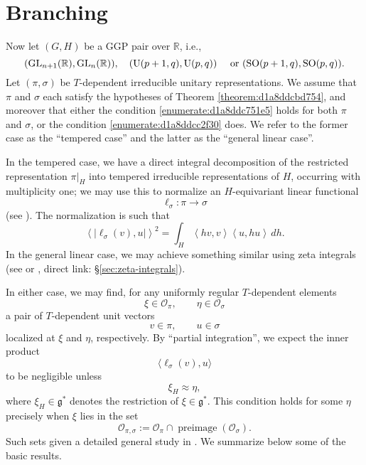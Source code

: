 \documentclass[reqno]{amsart} 
\numberwithin{equation}{section}
\numberwithin{theorem}{section}
\begin{document}
\section{Branching}\label{sec:d1a8de615a31}
Now let $(G,H)$ be a GGP pair over $\mathbb{R}$, i.e.,
\begin{equation*}
  (\operatorname{GL}_{n+1}(\mathbb{R}), \operatorname{GL}_n(\mathbb{R})),
  \quad
  (\operatorname{U}(p+1,q), \operatorname{U}(p,q))
  \quad
  \text{ or } 
  (\operatorname{SO}(p+1,q), \operatorname{SO}(p,q)).
\end{equation*}
Let $(\pi,\sigma)$ be $T$-dependent irreducible unitary representations.  We assume that $\pi$ and $\sigma$ each satisfy the hypotheses of Theorem \ref{theorem:d1a8ddcbd754}, and moreover that either the condition \eqref{enumerate:d1a8ddc751e5} holds for both $\pi$ and $\sigma$, or the condition \eqref{enumerate:d1a8ddcc2f30} does.  We refer to the former case as the ``tempered case'' and the latter as the ``general linear case''.

In the tempered case, we have a direct integral decomposition of the restricted representation $\pi|_{H}$ into tempered irreducible representations of $H$, occurring with multiplicity one; we may use this to normalize an $H$-equivariant linear functional
\begin{equation*}
  \ell_\sigma : \pi \rightarrow \sigma
\end{equation*}
(see \cite[\S18]{nelson-venkatesh-1}).  The normalization is such that
\begin{equation}\label{eqn:d1a8de462057}
  \left\langle \left\lvert \ell_\sigma(v), u \right\rvert \right\rangle^2
  = \int_{H} \left\langle h v, v \right\rangle \left\langle u , h u  \right\rangle \, d h.
\end{equation}
In the general linear case, we may achieve something similar using zeta integrals (see \cite{MR701565} or \cite[\S2.14.4]{2021arXiv210915230N}, direct link: \S\ref{sec:zeta-integrals}).

In either case, we may find, for any uniformly regular $T$-dependent elements
\begin{equation*}
  \xi \in \mathcal{O}_\pi, \qquad  \eta \in \mathcal{O}_\sigma
\end{equation*}
a pair of $T$-dependent unit vectors
\begin{equation*}
  v \in \pi, \qquad u \in \sigma 
\end{equation*}
localized at $\xi$ and $\eta$, respectively.  By ``partial integration'', we expect the inner product
\begin{equation*}
  \langle \ell_\sigma(v), u \rangle
\end{equation*}
to be negligible unless
\begin{equation*}
  \xi_H \approx \eta,
\end{equation*}
where $\xi_H \in \mathfrak{g}^*$ denotes the restriction of $\xi \in \mathfrak{g}^*$.  This condition holds for some $\eta$ precisely when $\xi$ lies in the set
\begin{equation*}
  \mathcal{O}_{\pi,\sigma} := \mathcal{O}_\pi \cap \operatorname{preimage}(\mathcal{O}_\sigma).
\end{equation*}
Such sets given a detailed general study in \cite{nelson-venkatesh-1}.  We summarize below some of the basic results.
\end{document}

